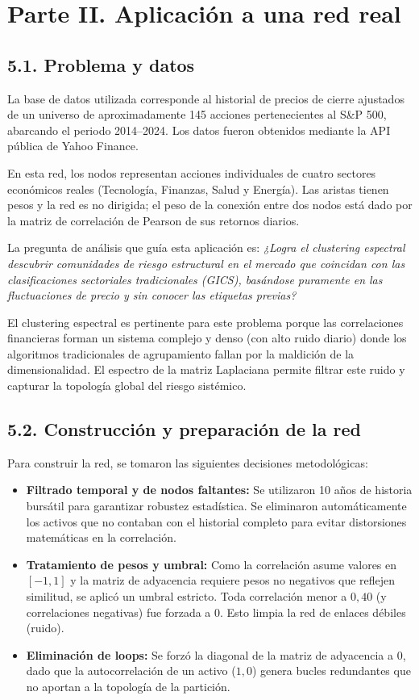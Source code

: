 \documentclass{article}
\begin{document}
	\section*{Parte II. Aplicación a una red real}
	
	\subsection*{5.1. Problema y datos}
	La base de datos utilizada corresponde al historial de precios de cierre ajustados de un universo de aproximadamente 145 acciones pertenecientes al S\&P 500, abarcando el periodo 2014--2024. Los datos fueron obtenidos mediante la API pública de Yahoo Finance.
	
	En esta red, los nodos representan acciones individuales de cuatro sectores económicos reales (Tecnología, Finanzas, Salud y Energía). Las aristas tienen pesos y la red es no dirigida; el peso de la conexión entre dos nodos está dado por la matriz de correlación de Pearson de sus retornos diarios.
	
	La pregunta de análisis que guía esta aplicación es: \textit{¿Logra el clustering espectral descubrir comunidades de riesgo estructural en el mercado que coincidan con las clasificaciones sectoriales tradicionales (GICS), basándose puramente en las fluctuaciones de precio y sin conocer las etiquetas previas?}
	
	El clustering espectral es pertinente para este problema porque las correlaciones financieras forman un sistema complejo y denso (con alto ruido diario) donde los algoritmos tradicionales de agrupamiento fallan por la maldición de la dimensionalidad. El espectro de la matriz Laplaciana permite filtrar este ruido y capturar la topología global del riesgo sistémico.
	
	\subsection*{5.2. Construcción y preparación de la red}
	Para construir la red, se tomaron las siguientes decisiones metodológicas:
	\begin{itemize}
		\item \textbf{Filtrado temporal y de nodos faltantes:} Se utilizaron 10 años de historia bursátil para garantizar robustez estadística. Se eliminaron automáticamente los activos que no contaban con el historial completo para evitar distorsiones matemáticas en la correlación.
		\item \textbf{Tratamiento de pesos y umbral:} Como la correlación asume valores en \([-1, 1]\) y la matriz de adyacencia requiere pesos no negativos que reflejen similitud, se aplicó un umbral estricto. Toda correlación menor a $0{,}40$ (y correlaciones negativas) fue forzada a $0$. Esto limpia la red de enlaces débiles (ruido).
		\item \textbf{Eliminación de loops:} Se forzó la diagonal de la matriz de adyacencia a $0$, dado que la autocorrelación de un activo ($1{,}0$) genera bucles redundantes que no aportan a la topología de la partición.
	\end{itemize}
	
\end{document}
